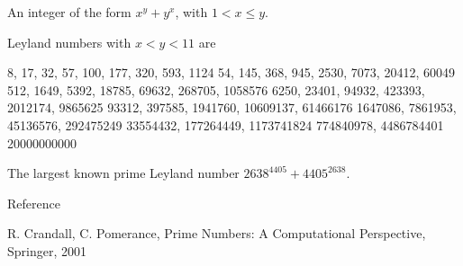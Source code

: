 \documentclass[12pt]{article}
\begin{document}
An integer of the form $x^y + y^x$, with $1 < x \leq y$.

Leyland numbers with $x < y < 11$ are

8, 17,  32,   57,   100,     177,      320,       593,        1124
   54, 145,  368,   945,    2530,     7073,     20412,       60049
       512, 1649,  5392,   18785,    69632,    268705,     1058576
            6250, 23401,   94932,   423393,   2012174,     9865625
                  93312,  397585,  1941760,  10609137,    61466176
                         1647086,  7861953,  45136576,   292475249
                                  33554432, 177264449,  1173741824
                                            774840978,  4486784401
                                                       20000000000

The largest known prime Leyland number $2638^{4405} + 4405^{2638}$.

Reference

R. Crandall, C. Pomerance, Prime Numbers: A Computational Perspective, Springer, 2001
\end{document}
